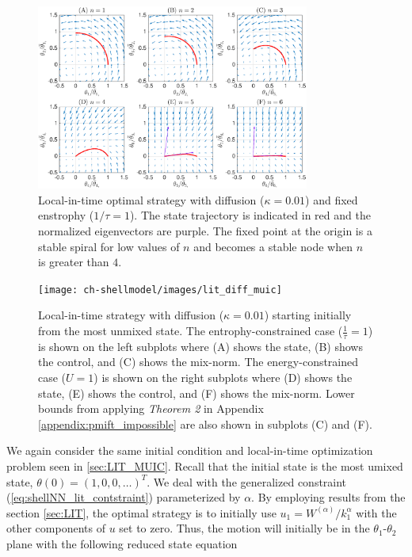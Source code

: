 \begin{figure}[!ht]
	\centering
	\includegraphics[width=0.8\textwidth]{ch-shellmodel/images/phase_portraits}
	\caption{Local-in-time optimal strategy with diffusion ($\kappa=0.01$) and fixed enstrophy ($1/\tau=1$). The state trajectory is indicated in red and the normalized eigenvectors are purple. The fixed point at the origin is a stable spiral for low values of $n$ and becomes a stable node when $n$ is greater than $4$.  }
	\label{fig:diffusion_phase_portraits}
\end{figure}



\begin{figure}[!ht]
	\centering
	\texttt{[image: ch-shellmodel/images/lit\_diff\_muic]}
	\caption{Local-in-time strategy with diffusion ($\kappa=0.01$) starting initially from the most unmixed state. The entrophy-constrained case ($\frac{1}{\tau}=1$) is shown on the left subplots where (A) shows the state, (B) shows the control, and (C) shows the mix-norm. The energy-constrained case ($U=1$) is shown on the right subplots where (D) shows the state, (E) shows the control, and (F) shows the mix-norm. Lower bounds from applying {\it Theorem 2} in Appendix \ref{appendix:pmift_impossible} are also shown in subplots (C) and (F).}
	\label{fig:lit_diff_muic}
\end{figure}

We again consider the same initial condition and local-in-time optimization problem seen in \ref{sec:LIT_MUIC}. Recall that the initial state is the most umixed state, $\theta(0)=(1, 0, 0, \dots )^{T}$. We deal with the generalized constraint (\ref{eq:shellNN_lit_contstraint}) parameterized by $\alpha$. By employing results from the section \ref{sec:LIT}, the optimal strategy is to initially use $u_{1}=W^{(\alpha)}/k_{1}^{\alpha}$ with the other components of $u$ set to zero. Thus,  the motion will initially be in the $\theta_{1}$-$\theta_{2}$ plane with the following reduced state equation

